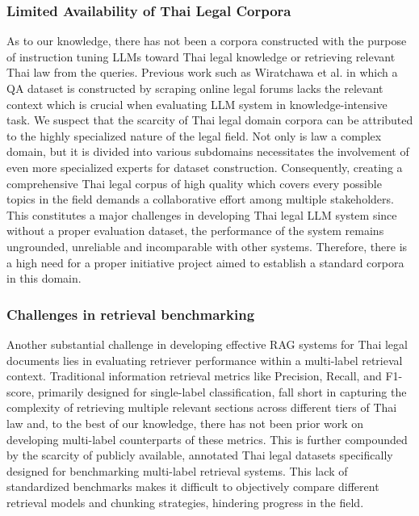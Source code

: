 \subsubsection{Limited Availability of Thai Legal Corpora}
As to our knowledge, there has not been a corpora constructed with the purpose of instruction tuning LLMs toward Thai legal knowledge or retrieving relevant Thai law from the queries. Previous work such as Wiratchawa et al.\cite{thlegalbert} in which a QA dataset is constructed by scraping online legal forums lacks the relevant context which is crucial when evaluating LLM system in knowledge-intensive task. We suspect that the scarcity of Thai legal domain corpora can be attributed to the highly specialized nature of the legal field. Not only is law a complex domain, but it is divided into various subdomains necessitates the involvement of even more specialized experts for dataset construction. Consequently, creating a comprehensive Thai legal corpus of high quality which covers every possible topics in the field demands a collaborative effort among multiple stakeholders. This constitutes a major challenges in developing Thai legal LLM system since without a proper evaluation dataset, the performance of the system remains ungrounded, unreliable and incomparable with other systems. Therefore, there is a high need for a proper initiative project aimed to establish a standard corpora in this domain.

\subsubsection{Challenges in retrieval benchmarking}

Another substantial challenge in developing effective RAG systems for Thai legal documents lies in evaluating retriever performance within a multi-label retrieval context. Traditional information retrieval metrics like Precision, Recall, and F1-score, primarily designed for single-label classification, fall short in capturing the complexity of retrieving multiple relevant sections across different tiers of Thai law and, to the best of our knowledge, there has not been prior work on developing multi-label counterparts of these metrics. This is further compounded by the scarcity of publicly available, annotated Thai legal datasets specifically designed for benchmarking multi-label retrieval systems. This lack of standardized benchmarks makes it difficult to objectively compare different retrieval models and chunking strategies, hindering progress in the field. 

